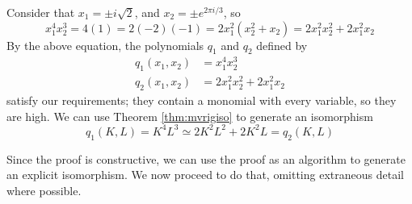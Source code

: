 \documentclass{msthesis}
\theoremstyle{definition}
\begin{document}
Consider that $x_1 = \pm i\sqrt{2}$, and $x_2 = \pm e^{2 \pi i/3}$, so 
\[ x_1^4x_2^3 = 4(1) = 2(-2)(-1) = 2x_1^2(x_2^2 + x_2) = 2x_1^2x_2^2 + 2x_1^2x_2\]
By the above equation, the polynomials $q_1$ and $q_2$ defined by
\begin{align*}
    q_1(x_1,x_2) &= x_1^4x_2^3 \\
    q_2(x_1,x_2) &= 2x_1^2x_2^2 + 2x_1^2x_2
\end{align*}
satisfy our requirements; they contain a monomial with every variable, so they are high.  We can use Theorem \ref{thm:mvrigiso} to generate an isomorphism
\[ q_1(K,L) = K^4L^3 \simeq 2K^2L^2 + 2K^2L = q_2(K,L)\]

Since the proof is constructive, we can use the proof as an algorithm to generate an explicit isomorphism. We now proceed to do that, omitting extraneous detail where possible.
\end{document}
